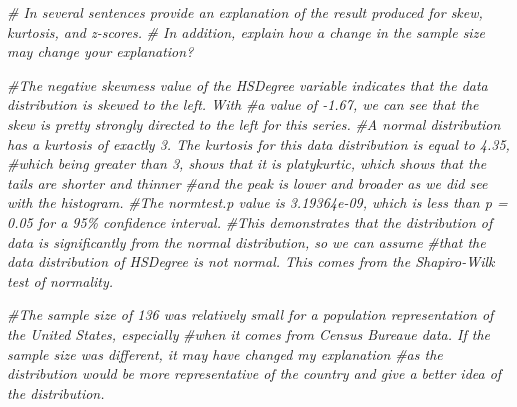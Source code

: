 \documentclass[
]{article}
\newenvironment{Shaded}{\begin{snugshade}}{\end{snugshade}}
\newcommand{\CommentTok}[1]{\textcolor[rgb]{0.56,0.35,0.01}{\textit{#1}}}
\begin{document}
\begin{Shaded}
\begin{Highlighting}[]
\CommentTok{\# In several sentences provide an explanation of the result produced for skew, kurtosis, and z{-}scores. }
\CommentTok{\# In addition, explain how a change in the sample size may change your explanation?}

\CommentTok{\#The negative skewness value of the HSDegree variable indicates that the data distribution is skewed to the left. With}
\CommentTok{\#a value of {-}1.67, we can see that the skew is pretty strongly directed to the left for this series.}
\CommentTok{\#A normal distribution has a kurtosis of exactly 3. The kurtosis for this data distribution is equal to 4.35,}
\CommentTok{\#which being greater than 3, shows that it is platykurtic, which shows that the tails are shorter and thinner}
\CommentTok{\#and the peak is lower and broader as we did see with the histogram. }
\CommentTok{\#The normtest.p value is 3.19364e{-}09, which is less than p = 0.05 for a 95\% confidence interval.}
\CommentTok{\#This demonstrates that the distribution of data is significantly from the normal distribution, so we can assume}
\CommentTok{\#that the data distribution of HSDegree is not normal. This comes from the Shapiro{-}Wilk test of normality.}

\CommentTok{\#The sample size of 136 was relatively small for a population representation of the United States, especially}
\CommentTok{\#when it comes from Census Bureaue data. If the sample size was different, it may have changed my explanation}
\CommentTok{\#as the distribution would be more representative of the country and give a better idea of the distribution. }
\end{Highlighting}
\end{Shaded}
\end{document}
